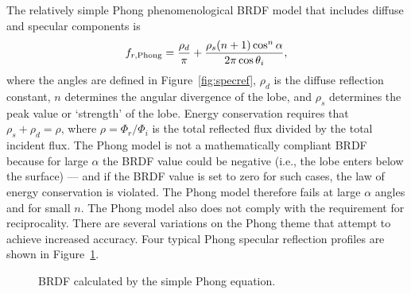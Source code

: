 The relatively simple Phong phenomenological BRDF model that includes diffuse and specular components is
\begin{equation}
f_{r,{\rm Phong}} = \frac{\rho_d}{\pi} + \frac{\rho_s(n+1)\cos^n\alpha}{2\pi\cos\theta_i},
\label{eq:BRDFequationPhong}
\end{equation}
where the angles are defined in Figure~\ref{fig:specref},
$\rho_d$ is the diffuse reflection constant,
$n$ determines the angular divergence of the lobe, and $\rho_s$ determines the peak value or `strength' of the lobe. Energy conservation requires that $\rho_s + \rho_d = \rho$, where $\rho=\Phi_r/\Phi_i$ is the total reflected flux divided by the total incident flux. The Phong model is not a  mathematically compliant BRDF because for large $\alpha$ the BRDF value could be negative (i.e., the lobe enters below the surface) --- and if the BRDF value is set to zero for such cases, the law of energy conservation is violated.  The Phong model therefore fails at large $\alpha$ angles and for small $n$. The Phong model also does not comply with the requirement for reciprocality.  There are several variations on the Phong theme that attempt to achieve increased accuracy.  Four typical Phong specular reflection profiles are shown in Figure~\ref{fig:brdfPhongProfiles}.


\begin{figure}[bt]
\centering
{}
\caption{BRDF calculated by the simple Phong equation. \label{fig:brdfPhongProfiles}}
\end{figure}


